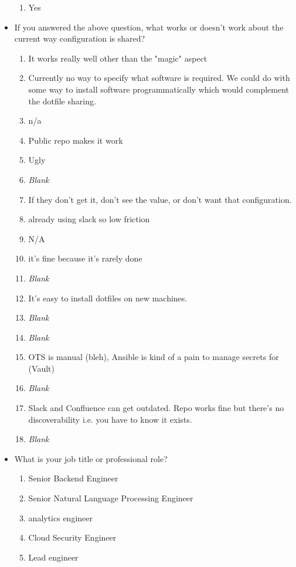 \documentclass[letterpaper]{jdf}
\begin{document}
\begin{itemize}
\begin{enumerate}
        \item Yes
    \end{enumerate}
    \item If you answered the above question, what works or doesn't work about the current way configuration is shared?
    \begin{enumerate}
        \item It works really well other than the "magic" aspect
        \item Currently no way to specify what software is required. We could do with some way to install software programmatically which would complement the dotfile sharing.
        \item n/a
        \item Public repo makes it work
        \item Ugly
        \item \emph{Blank}
        \item If they don't get it, don't see the value, or don't want that configuration.
        \item already using slack so low friction
        \item N/A
        \item it's fine because it's rarely done
        \item \emph{Blank}
        \item It's easy to install dotfiles on new machines.
        \item \emph{Blank}
        \item \emph{Blank}
        \item OTS is manual (bleh), Ansible is kind of a pain to manage secrets for (Vault)
        \item \emph{Blank}
        \item Slack and Confluence can get outdated. Repo works fine but there's no discoverability i.e. you have to know it exists.
        \item \emph{Blank}
    \end{enumerate}
    \item What is your job title or professional role?
    \begin{enumerate}
        \item Senior Backend Engineer
        \item Senior Natural Language Processing Engineer
        \item analytics engineer
        \item Cloud Security Engineer
        \item Lead engineer

\end{enumerate}
\end{itemize}
\end{document}
